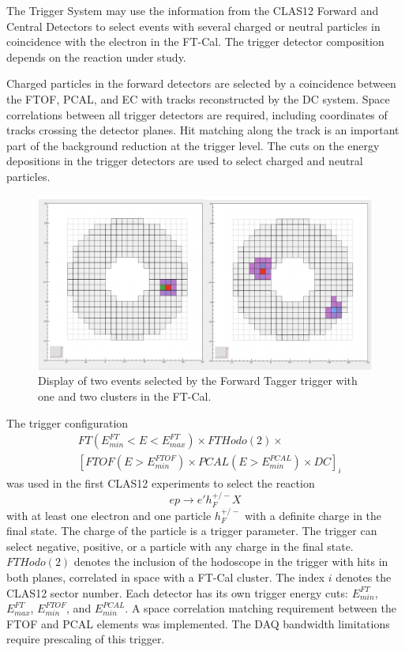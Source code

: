 The Trigger System may use the  information from the CLAS12 Forward and Central Detectors to select
events with several charged or neutral particles in coincidence with the electron in the FT-Cal. The trigger
detector composition depends on the reaction under study. 

Charged particles in the forward detectors are selected by a coincidence between the FTOF, PCAL, and EC
with tracks reconstructed by the DC system. Space correlations between all trigger detectors are required,
including coordinates of tracks crossing the detector planes. Hit matching along the track is an important
part of the background reduction at the trigger level. The cuts on the energy depositions in the trigger
detectors are used to select charged and neutral particles. 

 \begin{figure}[!htb]
 	\centering
  	\includegraphics[width=0.95\columnwidth,keepaspectratio]{img/FT_trigger.png}
 	\caption{Display of two events selected by the Forward Tagger trigger with one and two clusters in the
          FT-Cal.}
	\label{fig:FT_trigger}
\end{figure}

The trigger configuration 
 \begin{align*} 
 &FT(E^{FT}_{min}{<}E{<}E^{FT}_{max})\times FTHodo(2)\times\\
 & [FTOF(E{>}E^{FTOF}_{min})\times PCAL(E{>}E^{PCAL}_{min})\times  DC]_i
\end{align*}
was used in the first CLAS12 experiments to select the reaction 
$$ep\to e'h^{+/-}_F X$$
with at least one electron and one particle $h^{+/-}_F$ with a definite charge in the final state. The charge of
the particle is a trigger parameter. The trigger can select negative, positive, or a particle with any charge in
the final state. $FTHodo(2)$ denotes the inclusion of the hodoscope in the trigger with hits in both planes,
correlated in space with a FT-Cal cluster. The index $i$ denotes the CLAS12 sector number. Each detector
has its own trigger energy cuts: $ E^{FT}_{min}$,  $E^{FT}_{max}$, $E^{FTOF}_{min}$, and $E^{PCAL}_{min}$. A space
correlation matching requirement between the FTOF and PCAL elements was implemented. The DAQ bandwidth
limitations require prescaling of this trigger.

